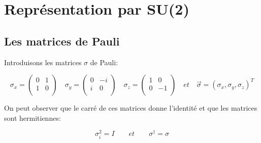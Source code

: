 \documentclass[12pt,a4paper]{article}
\begin{document}
\newpage
\section{Représentation par SU(2)}
	\subsection{Les matrices de Pauli}
	 Introduisons les matrices $\sigma$ de Pauli:
	
	\[
	\sigma_x=\begin{pmatrix}
	0&1\\
	1&0\\
	\end{pmatrix}\quad
	\sigma_y=\begin{pmatrix}
	0&-i\\
	i&0\\
	\end{pmatrix}\quad
	\sigma_z=\begin{pmatrix}
	1&0\\
	0&-1\\
	\end{pmatrix}\quad et\quad \vec{\sigma}=(\sigma_x,\sigma_y,\sigma_z)^T
	\]
	
	On peut observer que le carré de ces matrices donne l'identité et que les matrices sont hermitiennes:  
	
	\[
		\boxed{\sigma_i^2=I}\quad\quad et \quad\quad \boxed{\sigma^{\dagger}=\sigma}
	\]
	
\end{document}
